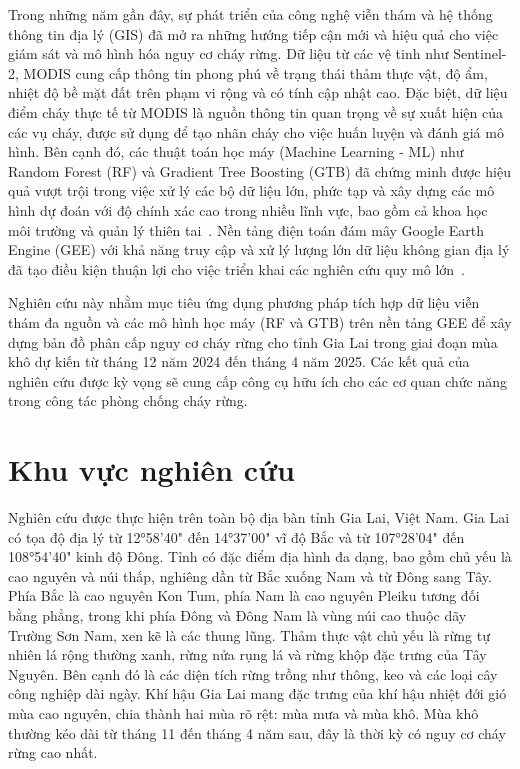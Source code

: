 \documentclass{article}
\begin{document}
Trong những năm gần đây, sự phát triển của công nghệ viễn thám và hệ thống thông tin địa lý (GIS) đã mở ra những hướng tiếp cận mới và hiệu quả cho việc giám sát và mô hình hóa nguy cơ cháy rừng. Dữ liệu từ các vệ tinh như Sentinel-2, MODIS cung cấp thông tin phong phú về trạng thái thảm thực vật, độ ẩm, nhiệt độ bề mặt đất trên phạm vi rộng và có tính cập nhật cao. Đặc biệt, dữ liệu điểm cháy thực tế từ MODIS là nguồn thông tin quan trọng về sự xuất hiện của các vụ cháy, được sử dụng để tạo nhãn cháy cho việc huấn luyện và đánh giá mô hình. Bên cạnh đó, các thuật toán học máy (Machine Learning - ML) như Random Forest (RF) và Gradient Tree Boosting (GTB) đã chứng minh được hiệu quả vượt trội trong việc xử lý các bộ dữ liệu lớn, phức tạp và xây dựng các mô hình dự đoán với độ chính xác cao trong nhiều lĩnh vực, bao gồm cả khoa học môi trường và quản lý thiên tai~\cite{Breiman2001, Friedman2001, ForestFirePredictionML2022}. Nền tảng điện toán đám mây Google Earth Engine (GEE) với khả năng truy cập và xử lý lượng lớn dữ liệu không gian địa lý đã tạo điều kiện thuận lợi cho việc triển khai các nghiên cứu quy mô lớn~\cite{Gorelick2017}.

Nghiên cứu này nhằm mục tiêu ứng dụng phương pháp tích hợp dữ liệu viễn thám đa nguồn và các mô hình học máy (RF và GTB) trên nền tảng GEE để xây dựng bản đồ phân cấp nguy cơ cháy rừng cho tỉnh Gia Lai trong giai đoạn mùa khô dự kiến từ tháng 12 năm 2024 đến tháng 4 năm 2025. Các kết quả của nghiên cứu được kỳ vọng sẽ cung cấp công cụ hữu ích cho các cơ quan chức năng trong công tác phòng chống cháy rừng.

\section{Khu vực nghiên cứu} %
Nghiên cứu được thực hiện trên toàn bộ địa bàn tỉnh Gia Lai, Việt Nam. Gia Lai có tọa độ địa lý từ 12°58'40" đến 14°37'00" vĩ độ Bắc và từ 107°28'04" đến 108°54'40" kinh độ Đông. Tỉnh có đặc điểm địa hình đa dạng, bao gồm chủ yếu là cao nguyên và núi thấp, nghiêng dần từ Bắc xuống Nam và từ Đông sang Tây. Phía Bắc là cao nguyên Kon Tum, phía Nam là cao nguyên Pleiku tương đối bằng phẳng, trong khi phía Đông và Đông Nam là vùng núi cao thuộc dãy Trường Sơn Nam, xen kẽ là các thung lũng. Thảm thực vật chủ yếu là rừng tự nhiên lá rộng thường xanh, rừng nửa rụng lá và rừng khộp đặc trưng của Tây Nguyên. Bên cạnh đó là các diện tích rừng trồng như thông, keo và các loại cây công nghiệp dài ngày. Khí hậu Gia Lai mang đặc trưng của khí hậu nhiệt đới gió mùa cao nguyên, chia thành hai mùa rõ rệt: mùa mưa và mùa khô. Mùa khô thường kéo dài từ tháng 11 đến tháng 4 năm sau, đây là thời kỳ có nguy cơ cháy rừng cao nhất.
\end{document}
